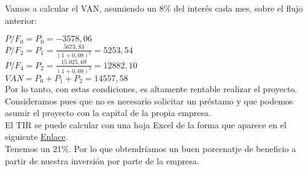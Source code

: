 Vamos a calcular el VAN, asumiendo un 8\% del interés cada mes, sobre el flujo anterior:

$P/F_0 = P_0 = -3578,06 $ \\

$P/F_2 = P_1 = \frac{5673,83}{(1+0,08)^1} = 5253,54  $ \\

$P/F_4 = P_2 = \frac{15.025,69}{(1+0,08)^2} = 12882,10  $\\

$VAN = P_0 + P_1 + P_2  = 14557,58$\\

Por lo tanto, con estas condiciones, es altamente rentable realizar el proyecto. Consideramos pues que no es necesario solicitar un préstamo y que podemos asumir el proyecto con la capital de la propia empresa.\\

El TIR se puede calcular con una hoja Excel de la forma que aparece en el siguiente \href{https://support.office.com/es-es/article/tir-funci%C3%B3n-tir-64925eaa-9988-495b-b290-3ad0c163c1bc}{Enlace}. \cite{misc:TIR} \\
	
Tenemos un 21\%. Por lo que obtendríamos un buen porcenatje de beneficio a partir de nuestra inversión por parte de la empresa.


\newpage



       
